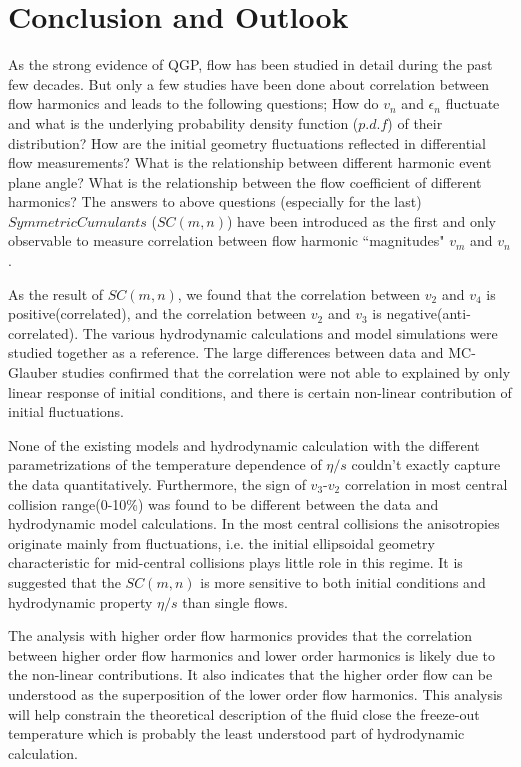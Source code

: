 

\chapter{Conclusion and Outlook}

As the strong evidence of QGP, flow has been studied in detail during the past few decades. But only a few studies have been done about correlation between flow harmonics and leads to the following questions; How do $v_n$ and $\epsilon_n$ fluctuate and what is the underlying probability density function ($p.d.f$) of their distribution? How are the initial geometry fluctuations reflected in differential flow measurements? What is the relationship between different harmonic event plane angle? What is the relationship between the flow coefficient of different harmonics? The answers to above questions (especially for the last) $Symmetric Cumulants$ ($SC(m,n)$) have been introduced as the first and only observable to measure correlation between flow harmonic ``magnitudes" $v_m$ and $v_n$.

As the result of $SC(m,n)$, we found that the correlation between $v_2$ and $v_4$ is positive(correlated), and the correlation between $v_2$ and $v_3$ is negative(anti-correlated). The various hydrodynamic calculations and model simulations were studied together as a reference. The large differences between data and MC-Glauber studies confirmed that the correlation were not able to explained by only linear response of initial conditions, and there is certain non-linear contribution of initial fluctuations. 

 None of the existing models and hydrodynamic calculation with the different parametrizations of the temperature dependence of $\eta/s$ couldn't exactly capture the data quantitatively. Furthermore, the sign of $v_3$-$v_2$ correlation in most central collision range(0-10\%) was found to be different between the data and hydrodynamic model calculations.  In the most central collisions the anisotropies originate mainly from fluctuations, i.e. the initial ellipsoidal geometry characteristic for mid-central collisions plays little role in this regime.  It is suggested that the $SC(m,n)$ is more sensitive to both initial conditions and hydrodynamic property $\eta/s$ than single flows.  

The analysis with higher order flow harmonics provides that the correlation between higher order flow harmonics and lower order harmonics is likely due to the non-linear contributions. It  also indicates that the higher order flow can be understood as the superposition of the lower order flow harmonics. This analysis will help constrain the theoretical description of the fluid close the freeze-out temperature which is probably the least understood part of hydrodynamic calculation. \cite{Teaney:2012ke} \cite{Yan:2015dh}

